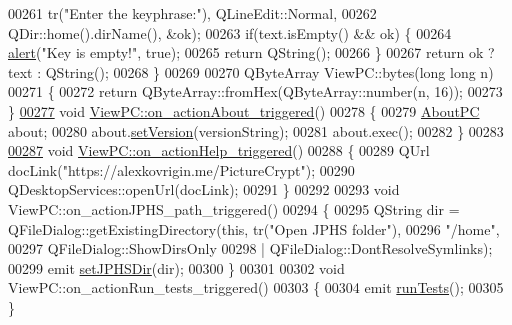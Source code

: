 \begin{DoxyCode}
00261                                          tr(\textcolor{stringliteral}{"Enter the keyphrase:"}), QLineEdit::Normal,
00262                                          QDir::home().dirName(), &ok);
00263     \textcolor{keywordflow}{if}(text.isEmpty() && ok) \{
00264         \hyperlink{class_view_p_c_a7c467169467789561078abc9d4fe57bd}{alert}(\textcolor{stringliteral}{"Key is empty!"}, \textcolor{keyword}{true});
00265         \textcolor{keywordflow}{return} QString();
00266     \}
00267     \textcolor{keywordflow}{return} ok ? text : QString();
00268 \}
00269 
00270 QByteArray ViewPC::bytes(\textcolor{keywordtype}{long} \textcolor{keywordtype}{long} n)
00271 \{
00272     \textcolor{keywordflow}{return} QByteArray::fromHex(QByteArray::number(n, 16));
00273 \}
\hypertarget{viewpc_8cpp_source_l00277}{}\hyperlink{class_view_p_c_a09a46da4d492eb3dde88f35dc58c997b}{00277} \textcolor{keywordtype}{void} \hyperlink{class_view_p_c_a09a46da4d492eb3dde88f35dc58c997b}{ViewPC::on\_actionAbout\_triggered}()
00278 \{
00279     \hyperlink{class_about_p_c}{AboutPC} about;
00280     about.\hyperlink{class_about_p_c_aa3815d4826d0c8d87122449537a0a4d5}{setVersion}(versionString);
00281     about.exec();
00282 \}
00283 
\hypertarget{viewpc_8cpp_source_l00287}{}\hyperlink{class_view_p_c_a0d252ff4829260c6c76769fbd24b7cd7}{00287} \textcolor{keywordtype}{void} \hyperlink{class_view_p_c_a0d252ff4829260c6c76769fbd24b7cd7}{ViewPC::on\_actionHelp\_triggered}()
00288 \{
00289     QUrl docLink(\textcolor{stringliteral}{"https://alexkovrigin.me/PictureCrypt"});
00290     QDesktopServices::openUrl(docLink);
00291 \}
00292 
00293 \textcolor{keywordtype}{void} ViewPC::on\_actionJPHS\_path\_triggered()
00294 \{
00295     QString dir = QFileDialog::getExistingDirectory(\textcolor{keyword}{this}, tr(\textcolor{stringliteral}{"Open JPHS folder"}),
00296                                                     \textcolor{stringliteral}{"/home"},
00297                                                     QFileDialog::ShowDirsOnly
00298                                                     | QFileDialog::DontResolveSymlinks);
00299     emit \hyperlink{class_view_p_c_ae81085836c0c01bc9556a5b27eb8d19c}{setJPHSDir}(dir);
00300 \}
00301 
00302 \textcolor{keywordtype}{void} ViewPC::on\_actionRun\_tests\_triggered()
00303 \{
00304     emit \hyperlink{class_view_p_c_a96a6c95728bf20c64d2a8fe978495395}{runTests}();
00305 \}
\end{DoxyCode}
